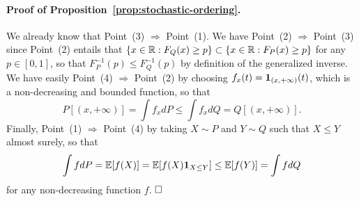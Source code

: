\paragraph{Proof of Proposition~\ref{prop:stochastic-ordering}.} %

We already know that Point~(3) $\Rightarrow$ Point~(1).
We have Point~(2) $\Rightarrow$ Point~(3) since Point~(2) entails that $\{ x \in \mathbb R : F_Q(x) \geq p\} \subset \{ x \in \mathbb R : F_P(x) \geq p\}$ for any $p \in [0, 1]$, so that $F_P^{-1}(p) \leq F_Q^{-1}(p)$ by definition of the generalized inverse.
We have easily Point~(4) $\Rightarrow$ Point~(2) by choosing $f_x(t) = \mathbf 1_{(x, +\infty)}(t)$, which is a non-decreasing and bounded function, so that
\begin{equation*}
	P[(x, +\infty)] = \int f_x dP \leq \int f_x dQ = Q[(x, +\infty)].
\end{equation*}
Finally, Point~(1) $\Rightarrow$ Point~(4) by taking $X \sim P$ and $Y \sim Q$ such that $X \leq Y$ almost surely, so that
\begin{equation*}
	\int f dP = \mathbb E[f(X)] = \mathbb E[f(X) \mathbf 1_{X \leq Y}] \leq \mathbb E[f(Y)] = \int f dQ
\end{equation*}
for any non-decreasing function $f$. $\hfill \square$
